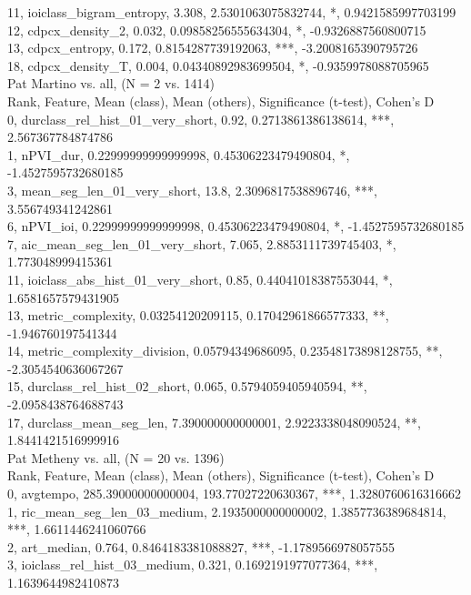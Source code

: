 11, ioiclass_bigram_entropy, 3.308, 2.5301063075832744, *, 0.9421585997703199\\
12, cdpcx_density_2, 0.032, 0.09858256555634304, *, -0.9326887560800715\\
13, cdpcx_entropy, 0.172, 0.8154287739192063, ***, -3.2008165390795726\\
18, cdpcx_density_T, 0.004, 0.04340892983699504, *, -0.9359978088705965\\
Pat Martino vs. all, (N = 2 vs. 1414)\\
Rank, Feature, Mean (class), Mean (others), Significance (t-test), Cohen's D\\
0, durclass_rel_hist_01_very_short, 0.92, 0.2713861386138614, ***, 2.567367784874786\\
1, nPVI_dur, 0.22999999999999998, 0.45306223479490804, *, -1.4527595732680185\\
3, mean_seg_len_01_very_short, 13.8, 2.3096817538896746, ***, 3.556749341242861\\
6, nPVI_ioi, 0.22999999999999998, 0.45306223479490804, *, -1.4527595732680185\\
7, aic_mean_seg_len_01_very_short, 7.065, 2.8853111739745403, *, 1.773048999415361\\
11, ioiclass_abs_hist_01_very_short, 0.85, 0.44041018387553044, *, 1.6581657579431905\\
13, metric_complexity, 0.03254120209115, 0.17042961866577333, **, -1.946760197541344\\
14, metric_complexity_division, 0.05794349686095, 0.23548173898128755, **, -2.3054540636067267\\
15, durclass_rel_hist_02_short, 0.065, 0.5794059405940594, **, -2.0958438764688743\\
17, durclass_mean_seg_len, 7.390000000000001, 2.9223338048090524, **, 1.8441421516999916\\
Pat Metheny vs. all, (N = 20 vs. 1396)\\
Rank, Feature, Mean (class), Mean (others), Significance (t-test), Cohen's D\\
0, avgtempo, 285.39000000000004, 193.77027220630367, ***, 1.3280760616316662\\
1, ric_mean_seg_len_03_medium, 2.1935000000000002, 1.3857736389684814, ***, 1.6611446241060766\\
2, art_median, 0.764, 0.8464183381088827, ***, -1.1789566978057555\\
3, ioiclass_rel_hist_03_medium, 0.321, 0.1692191977077364, ***, 1.1639644982410873\\
